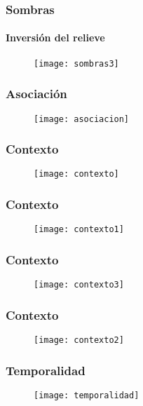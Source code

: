 \documentclass[14pt]{beamer}
\begin{document}
 \begin{frame}
\frametitle{Sombras}
\framesubtitle{Inversión del relieve}
 \begin{figure}
    \centering
    \texttt{[image: sombras3]}
  \end{figure}
\end{frame}
 \begin{frame}
\frametitle{Asociación}
 \begin{figure}
    \centering
    \texttt{[image: asociacion]}
  \end{figure}
\end{frame}
 \begin{frame}
\frametitle{Contexto}
 \begin{figure}
    \centering
    \texttt{[image: contexto]}
  \end{figure}
\end{frame}
 \begin{frame}
\frametitle{Contexto}
 \begin{figure}
    \centering
    \texttt{[image: contexto1]}
  \end{figure}
\end{frame}
 \begin{frame}
\frametitle{Contexto}
 \begin{figure}
    \centering
    \texttt{[image: contexto3]}
  \end{figure}
\end{frame}
 \begin{frame}
\frametitle{Contexto}
 \begin{figure}
    \centering
    \texttt{[image: contexto2]}
  \end{figure}
\end{frame}
 \begin{frame}
\frametitle{Temporalidad}
 \begin{figure}
    \centering
    \texttt{[image: temporalidad]}
  \end{figure}
\end{frame}
\end{document}

